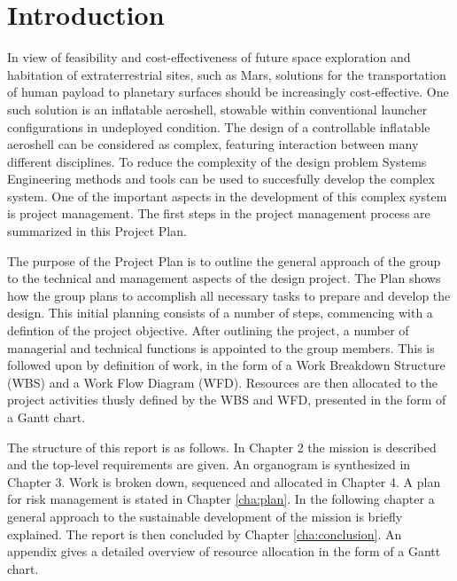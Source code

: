 \section{Introduction}\label{cha:introduction}
In view of feasibility and cost-effectiveness of future space exploration and habitation of extraterrestrial sites, such as Mars, solutions for the transportation of human payload to planetary surfaces should be increasingly cost-effective. One such solution is an inflatable aeroshell, stowable within conventional launcher configurations in undeployed condition. The design of a controllable inflatable aeroshell can be considered as complex, featuring interaction between many different disciplines. To reduce the complexity of the design problem Systems Engineering methods and tools can be used to succesfully develop the complex system. One of the important aspects in the development of this complex system is project management. The first steps in the project management process are summarized in this Project Plan.

The purpose of the Project Plan is to outline the general approach of the group to the technical and management aspects of the design project. The Plan shows how the group plans to accomplish all necessary tasks to prepare and develop the design. This initial planning consists of a number of steps, commencing with a defintion of the project objective. After outlining the project, a number of managerial and technical functions is appointed to the group members. This is followed upon by definition of work, in the form of a Work Breakdown Structure (WBS) and a Work Flow Diagram (WFD). Resources are then allocated to the project activities thusly defined by the WBS and WFD, presented in the form of a Gantt chart.

The structure of this report is as follows. In Chapter 2 the mission is described and the top-level requirements are given. An organogram is synthesized in Chapter 3. Work is broken down, sequenced and allocated in Chapter 4. A plan for risk management is stated in Chapter \ref{cha:plan}.  In the following chapter a general approach to the sustainable development of the mission is briefly explained. The report is then concluded by Chapter \ref{cha:conclusion}. An appendix gives a detailed overview of resource allocation in the form of a Gantt chart.